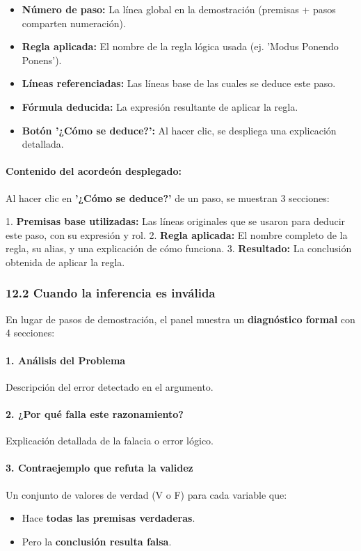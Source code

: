 \documentclass[11pt,a4paper]{article}
\begin{document}
\begin{itemize}[leftmargin=*]
\item \textbf{Número de paso:} La línea global en la demostración (premisas + pasos comparten numeración).
\item \textbf{Regla aplicada:} El nombre de la regla lógica usada (ej. 'Modus Ponendo Ponens').
\item \textbf{Líneas referenciadas:} Las líneas base de las cuales se deduce este paso.
\item \textbf{Fórmula deducida:} La expresión resultante de aplicar la regla.
\item \textbf{Botón '¿Cómo se deduce?':} Al hacer clic, se despliega una explicación detallada.
\end{itemize}

\paragraph{Contenido del acordeón desplegado:}

Al hacer clic en \textbf{'¿Cómo se deduce?'} de un paso, se muestran 3 secciones:

1. \textbf{Premisas base utilizadas:} Las líneas originales que se usaron para deducir este paso, con su expresión y rol.
2. \textbf{Regla aplicada:} El nombre completo de la regla, su alias, y una explicación de cómo funciona.
3. \textbf{Resultado:} La conclusión obtenida de aplicar la regla.

\subsubsection{12.2 Cuando la inferencia es inválida}

En lugar de pasos de demostración, el panel muestra un \textbf{diagnóstico formal} con 4 secciones:

\paragraph{1. Análisis del Problema}
Descripción del error detectado en el argumento.

\paragraph{2. ¿Por qué falla este razonamiento?}
Explicación detallada de la falacia o error lógico.

\paragraph{3. Contraejemplo que refuta la validez}
Un conjunto de valores de verdad (V o F) para cada variable que:
\begin{itemize}[leftmargin=*]
\item Hace \textbf{todas las premisas verdaderas}.
\item Pero la \textbf{conclusión resulta falsa}.
\end{itemize}
\end{document}
